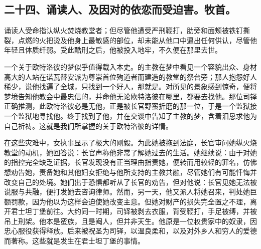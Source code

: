 \subsection{二十四、诵读人、及因对的依恋而受迫害。牧首。}

诵读人受命指认纵火焚烧教堂者；但尽管他遭受严刑鞭打，肋旁和面颊被铁钉撕裂，点燃的火把烫及他身上最敏感的部位，却未能从他口中逼出任何供认，尽管他年轻且体质纤弱。受此酷刑之后，他被投入地牢，不久便在那里去世。\par

一个关于欧特洛彼的梦似乎值得载入本史。的主教在梦中看见一个容貌出众、身材高大的人站在诺瓦替安派为尊崇首位殉道者而建造的教堂的祭台旁；那人抱怨好人稀少，说他找遍了全城，只找到一个好人，那就是。对所见的景象感到惊奇，便将梦境告知他教会中最忠信的，并命他无论欧特洛彼在哪里，都要去找他。那位司铎正确推测，此欧特洛彼必是无他，正是被长官野蛮折磨的那一位，于是一个监狱接一个监狱地寻找他。终于找到了他，并在交谈中告知了主教的梦，含着泪恳求他为自己祈祷。这就是我们所掌握的关于欧特洛彼的详情。\par

在这些灾难中，女执事显示了极大的刚毅。为此她被拖到法庭，长官审问她纵火烧教堂的动机，她回答说：长官声称他非常了解她过去的生活。她继续说：由于对她的指控完全缺乏证据，长官发现没有正当理由指责她，便转而用较轻的罪名，仿佛想劝告她，责备她和其他妇女拒绝与他所支持的主教共融，尽管她们有可能忏悔并改变自己的处境。她们出于恐惧都听从了长官的劝告，但对他说：长官见她无法被说服与共融，便打发她去咨询律师。然而，另一天，他又派人将她召来，判处她巨额罚款，因为他以为这样会迫使她改变主意。但她对财产的损失完全置之不理，离开君士坦丁堡前往。大约同一时期，司铎被剥去衣服，背受鞭打，手足被缚，并被吊上刑架。他本是蛮族，且是阉人，但并非天生。他原是一位权贵家中的奴隶，因忠心服役获得释放。后来被祝圣为司铎，以温良柔和，以及对外乡人和穷人的爱德而著称。这些就是发生在君士坦丁堡的事情。\par

